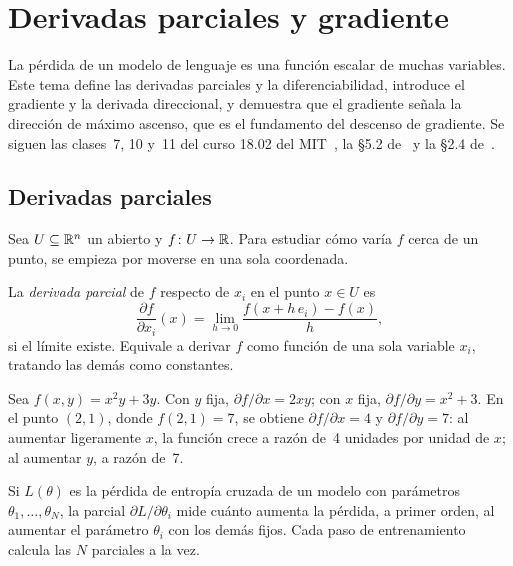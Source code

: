 \chapter{Derivadas parciales y gradiente}
\label{tema:1}

La pérdida de un modelo de lenguaje es una función escalar de muchas variables. Este tema define las derivadas parciales y la diferenciabilidad, introduce el gradiente y la derivada direccional, y demuestra que el gradiente señala la dirección de máximo ascenso, que es el fundamento del descenso de gradiente. Se siguen las clases~7, 10 y~11 del curso 18.02 del MIT~\cite{mit1802}, la §5.2 de~\cite{mml} y la §2.4 de~\cite{d2l}.

\section{Derivadas parciales}

Sea $U\subseteq\mathbb{R}^{n}$ un abierto y $f\colon U\to\mathbb{R}$. Para estudiar cómo varía $f$ cerca de un punto, se empieza por moverse en una sola coordenada.

\begin{definicion}\label{def:parcial}
La \emph{derivada parcial} de $f$ respecto de $x_i$ en el punto $x\in U$ es
\[
\frac{\partial f}{\partial x_i}(x)=\lim_{h\to 0}\frac{f(x+h\,e_i)-f(x)}{h},
\]
si el límite existe. Equivale a derivar $f$ como función de una sola variable $x_i$, tratando las demás como constantes.
\end{definicion}

\begin{ejemplo}\label{ej:parciales}
Sea $f(x,y)=x^{2}y+3y$. Con $y$ fija, $\partial f/\partial x=2xy$; con $x$ fija, $\partial f/\partial y=x^{2}+3$. En el punto $(2,1)$, donde $f(2,1)=7$, se obtiene $\partial f/\partial x=4$ y $\partial f/\partial y=7$: al aumentar ligeramente $x$, la función crece a razón de~4 unidades por unidad de $x$; al aumentar $y$, a razón de~7.
\end{ejemplo}

\begin{observacion}
Si $L(\theta)$ es la pérdida de entropía cruzada de un modelo con parámetros $\theta_1,\dots,\theta_N$, la parcial $\partial L/\partial\theta_i$ mide cuánto aumenta la pérdida, a primer orden, al aumentar el parámetro $\theta_i$ con los demás fijos. Cada paso de entrenamiento calcula las $N$ parciales a la vez.
\end{observacion}

